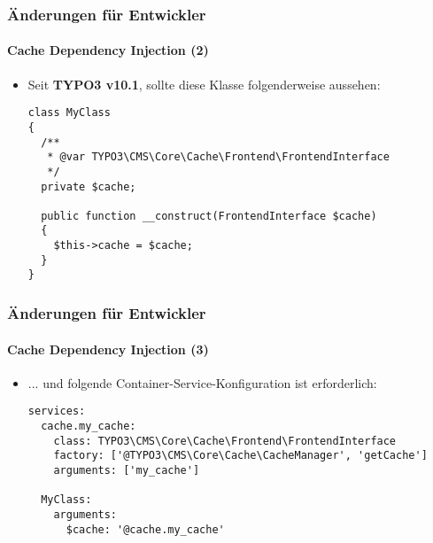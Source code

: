 
\begin{frame}[fragile]
	\frametitle{Änderungen für Entwickler}
	\framesubtitle{Cache Dependency Injection (2)}

	\lstset{basicstyle=\tiny\ttfamily}

	\begin{itemize}
		\item Seit \textbf{TYPO3 v10.1}, sollte diese Klasse folgenderweise aussehen:

\begin{lstlisting}
class MyClass
{
  /**
   * @var TYPO3\CMS\Core\Cache\Frontend\FrontendInterface
   */
  private $cache;

  public function __construct(FrontendInterface $cache)
  {
    $this->cache = $cache;
  }
}
\end{lstlisting}

	\end{itemize}

\end{frame}


\begin{frame}[fragile]
	\frametitle{Änderungen für Entwickler}
	\framesubtitle{Cache Dependency Injection (3)}

	\lstset{basicstyle=\tiny\ttfamily}

	\begin{itemize}
		\item ... und folgende Container-Service-Konfiguration ist erforderlich:

\begin{lstlisting}
services:
  cache.my_cache:
    class: TYPO3\CMS\Core\Cache\Frontend\FrontendInterface
    factory: ['@TYPO3\CMS\Core\Cache\CacheManager', 'getCache']
    arguments: ['my_cache']

  MyClass:
    arguments:
      $cache: '@cache.my_cache'
\end{lstlisting}

	\end{itemize}

\end{frame}

